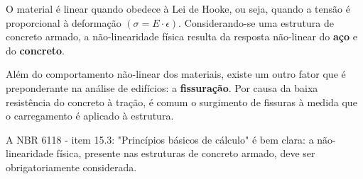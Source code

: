 O material é linear quando obedece à Lei de Hooke, ou seja, quando a tensão é proporcional à deformação $(\sigma=E\cdot \epsilon)$. Considerando-se uma estrutura de concreto armado, a não-linearidade física resulta da resposta não-linear do \textbf{aço} e do \textbf{concreto}.

Além do comportamento não-linear dos materiais, existe um outro fator que é preponderante na análise de edifícios: a \textbf{fissuração}. Por causa da baixa resistência do concreto à tração, é comum o surgimento de fissuras à medida que o carregamento é aplicado à estrutura.

A NBR 6118 - item 15.3: "Princípios básicos de cálculo" é bem clara: a não-linearidade física, presente nas estruturas de concreto armado, deve ser obrigatoriamente considerada.